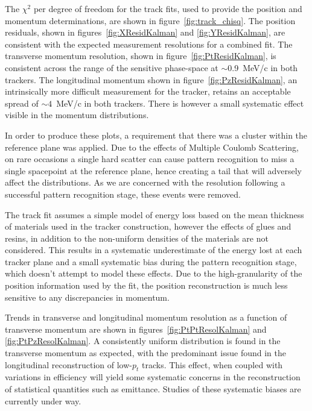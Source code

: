   The $\chi^2$ per degree of freedom for the track fits, used to provide the position and momentum determinations, are shown in figure~\ref{fig:track_chisq}. 
  The position residuals, shown in figures~\ref{fig:XResidKalman} and \ref{fig:YResidKalman}, are consistent with the expected measurement resolutions for a combined fit. The transverse momentum resolution, shown in figure~\ref{fig:PtResidKalman}, is consistent across the range of the sensitive phase-space at $\sim$0.9~MeV/c in both trackers. The longitudinal momentum shown in figure~\ref{fig:PzResidKalman}, an intrinsically more difficult measurement for the tracker, retains an acceptable spread of ${\sim4}$~MeV/c in both trackers. There is however a small systematic effect visible in the momentum distributions.

  In order to produce these plots, a requirement that there was a cluster within the reference plane was applied. Due to the effects of Multiple Coulomb Scattering, on rare occasions a single hard scatter can cause pattern recognition to miss a single spacepoint at the reference plane, hence creating a tail that will adversely affect the distributions. As we are concerned with the resolution following a successful pattern recognition stage, these events were removed.
  
  The track fit assumes a simple model of energy loss based on the mean thickness of materials used in the tracker construction, however the effects of glues and resins, in addition to the non-uniform densities of the materials are not considered. This results in a systematic underestimate of the energy lost at each tracker plane and a small systematic bias during the pattern recognition stage, which doesn't attempt to model these effects. Due to the high-granularity of the position information used by the fit, the position reconstruction is much less sensitive to any discrepancies in momentum. %
 
  Trends in transverse and longitudinal momentum resolution as a function of transverse momentum are shown in figures~\ref{fig:PtPtResolKalman} and \ref{fig:PtPzResolKalman}. A consistently uniform distribution is found in the transverse momentum as expected, with the predominant issue found in the longitudinal reconstruction of low-$p_t$ tracks. This effect, when coupled with variations in efficiency will yield some systematic concerns in the reconstruction of statistical quantities such as emittance. Studies of these systematic biases are currently under way.

 

